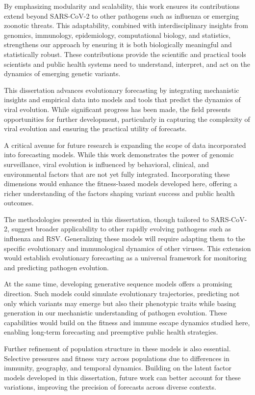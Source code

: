 By emphasizing modularity and scalability, this work ensures its contributions extend beyond SARS-CoV-2 to other pathogens such as influenza or emerging zoonotic threats.
This adaptability, combined with interdisciplinary insights from genomics, immunology, epidemiology, computational biology, and statistics, strengthens our approach by ensuring it is both biologically meaningful and statistically robust.
These contributions provide the scientific and practical tools scientists and public health systems need to understand, interpret, and act on the dynamics of emerging genetic variants.

This dissertation advances evolutionary forecasting by integrating mechanistic insights and empirical data into models and tools that predict the dynamics of viral evolution. While significant progress has been made, the field presents opportunities for further development, particularly in capturing the complexity of viral evolution and ensuring the practical utility of forecasts.

A critical avenue for future research is expanding the scope of data incorporated into forecasting models. While this work demonstrates the power of genomic surveillance, viral evolution is influenced by behavioral, clinical, and environmental factors that are not yet fully integrated.
Incorporating these dimensions would enhance the fitness-based models developed here, offering a richer understanding of the factors shaping variant success and public health outcomes.

The methodologies presented in this dissertation, though tailored to SARS-CoV-2, suggest broader applicability to other rapidly evolving pathogens such as influenza and RSV.
Generalizing these models will require adapting them to the specific evolutionary and immunological dynamics of other viruses.
This extension would establish evolutionary forecasting as a universal framework for monitoring and predicting pathogen evolution.

At the same time, developing generative sequence models offers a promising direction.
Such models could simulate evolutionary trajectories, predicting not only which variants may emerge but also their phenotypic traits while basing generation in our mechanistic understanding of pathogen evolution.
These capabilities would build on the fitness and immune escape dynamics studied here, enabling long-term forecasting and preemptive public health strategies.

Further refinement of population structure in these models is also essential.
Selective pressures and fitness vary across populations due to differences in immunity, geography, and temporal dynamics.
Building on the latent factor models developed in this dissertation, future work can better account for these variations, improving the precision of forecasts across diverse contexts.

